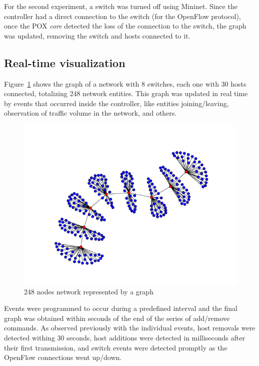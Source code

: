 For the second experiment, a switch was turned off using Mininet. Since the
controller had a direct connection to the switch (for the OpenFlow
protocol), once the POX \emph{core} detected the loss of the connection to
the switch, the graph was updated, removing the switch and hosts connected
to it.


\subsection{Real-time visualization}

Figure~\ref{fig:full_graph} shows the graph of a network  with 8 switches,
each one with 30 hosts connected, totalizing 248 network entities.
This graph was updated in real time by events that occurred inside the
controller, like entities joining/leaving, observation of traffic volume
in the network, and others.

\begin{figure}[htb!]
    \centering
    \includegraphics[width=1.0\columnwidth]{img/full_graph.png}
    \caption{248 nodes network represented by a graph}
    \label{fig:full_graph}
\end{figure}

Events were programmed to occur during a predefined interval and the final
graph was obtained within seconds of the end of the series of add/remove
commands. As observed previously with the individual events, host removals
were detected withing 30 seconds, host additions were detected in
milliseconds after their first transmission, and switch events were
detected promptly as the OpenFlow connections went up/down.


